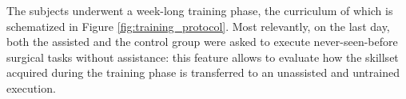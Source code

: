 \documentclass{article}
\newcommand{\cright}{\textsuperscript{\textregistered}\phantom{..}}
\begin{document}
\begin{multicols}{2}
The subjects underwent a week-long training phase, the curriculum of which is schematized in Figure \ref{fig:training_protocol}. Most relevantly, on the last day, both the assisted and the control group were asked to execute never-seen-before surgical tasks without assistance: this feature allows to evaluate how the skillset acquired during the training phase is transferred to an unassisted and untrained execution.

\end{multicols}
\end{document}
